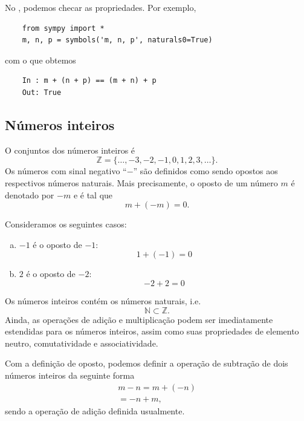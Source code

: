 \ifispython
\begin{obs}
  No \python, podemos checar as propriedades. Por exemplo,
  \begin{lstlisting}
    from sympy import *
    m, n, p = symbols('m, n, p', naturals0=True)
  \end{lstlisting}
  com o que obtemos
  \begin{lstlisting}
    In : m + (n + p) == (m + n) + p
    Out: True
  \end{lstlisting}
\end{obs}
\fi

\subsection{Números inteiros}

O conjuntos dos números inteiros é
\begin{equation}
  \mathbb{Z} = \{\ldots, -3, -2 , -1, 0, 1, 2, 3, \ldots\}.
\end{equation}
Os números com sinal negativo ``$-$'' são definidos como sendo opostos aos respectivos números naturais. Mais precisamente, o oposto de um número $m$ é denotado por $-m$ e é tal que
\begin{equation}
  m + (-m) = 0.
\end{equation}

\begin{ex}
  Consideramos os seguintes casos:
  \begin{enumerate}[a)]
  \item $-1$ é o oposto de $-1$:
    \begin{equation}
      1 + (-1) = 0
    \end{equation}
  \item $2$ é o oposto de $-2$:
    \begin{equation}
      -2 + 2 = 0
    \end{equation}
  \end{enumerate}
\end{ex}

Os números inteiros contém os números naturais, i.e.
\begin{equation}
  \mathbb{N} \subset \mathbb{Z}.
\end{equation}
Ainda, as operações de adição e multiplicação podem ser imediatamente estendidas para os números inteiros, assim como suas propriedades de elemento neutro, comutatividade e associatividade.

Com a definição de oposto, podemos definir a operação de subtração de dois números inteiros da seguinte forma
\begin{gather}
  m - n = m + (-n) \\
  = -n + m,
\end{gather}
sendo a operação de adição definida usualmente.

